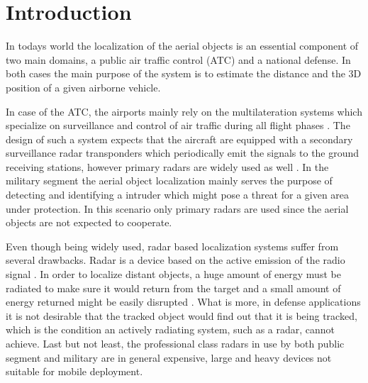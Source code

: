 

\setcounter{secnumdepth}{2}


\chapter{Introduction}
 

In todays world the localization of the aerial objects is an essential component of two main domains, a public air traffic control (ATC) and a national defense. In both cases the main purpose of the system is to estimate the distance and the 3D position of a given airborne vehicle.

In case of the ATC, the airports mainly rely on the multilateration systems which specialize on surveillance and control of air traffic during all flight phases \cite{Gaviria:newStrategiesMLAT}. The design of such a system expects that the aircraft are equipped with a secondary surveillance radar transponders which periodically emit the signals to the ground receiving stations, however primary radars are widely used as well \cite{Airtrafficmuseum}. In the military segment the aerial object localization mainly serves the purpose of detecting and identifying a intruder which might pose a threat for a given area under protection. In this scenario only primary radars are used since the aerial objects are not expected to cooperate.

Even though being widely used, radar based localization systems suffer from several drawbacks. Radar is a device based on the active emission of the radio signal \cite{toomay2012radar}. In order to localize distant objects, a huge amount of energy must be radiated to make sure it would return from the target and a small amount of energy returned might be easily disrupted \cite{Airtrafficmuseum}. What is more, in defense applications it is not desirable that the tracked object would find out that it is being tracked, which is the condition an actively radiating system, such as a radar, cannot achieve. Last but not least, the professional class radars in use by both public segment and military are in general expensive, large and heavy devices not suitable for mobile deployment.

